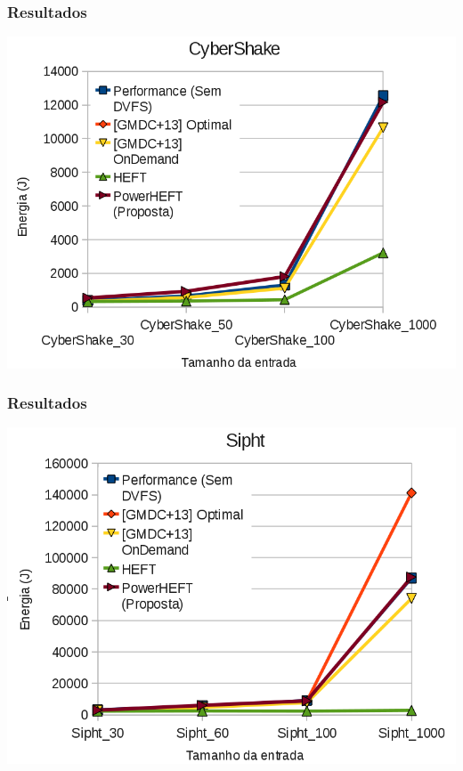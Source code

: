 \documentclass{beamer}
\begin{document}
\begin{frame}
\frametitle{Resultados}
	\begin{center}
		\includegraphics[width=0.9\columnwidth]{CyberShake.png}
	\end{center}
\end{frame}

\begin{frame}
\frametitle{Resultados}
	\begin{center}
		\includegraphics[width=0.9\columnwidth]{Sipht.png}
	\end{center}
\end{frame}
\end{document}
